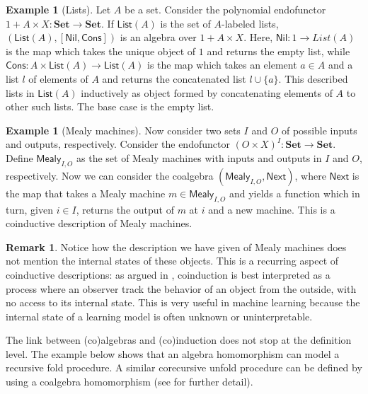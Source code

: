\documentclass[12pt,a4paper,openright,twoside]{report}
\theoremstyle{plain}
\theoremstyle{definition}
\newtheorem{remark}[proposition]{Remark}
\newtheorem{example}[proposition]{Example}
\begin{document}
\begin{example}[Lists]
  \label{ex: lists}
  Let $A$ be a set. Consider the polynomial endofunctor $1 + A \times X: \mathbf{Set} \to \mathbf{Set}$. If $\mathsf{List}(A)$ is the set of $A$-labeled lists, $(\mathsf{List}(A), [\mathsf{Nil}, \mathsf{Cons}])$ is an algebra over $1 + A \times X$. Here, $\mathsf{Nil}: 1 \to {List}(A)$ is the map which takes the unique object of $1$ and returns the empty list, while $\mathsf{Cons}: A \times \mathsf{List}(A) \to \mathsf{List}(A)$ is the map which takes an element $a \in A$ and a list $l$ of elements of $A$ and returns the concatenated list $l \cup \{a\}$. This described lists in $\mathsf{List}(A)$ inductively as object formed by concatenating elements of $A$ to other such lists. The base case is the empty list.
\end{example}

\begin{example}[Mealy machines]
  \label{ex: mealy}
  Now consider two sets $I$ and $O$ of possible inputs and outputs, respectively. Consider the endofunctor $(O \times X)^I: \mathbf{Set} \to \mathbf{Set}$.  Define $\mathsf{Mealy}_{I,O}$ as the set of Mealy machines with inputs and outputs in $I$ and $O$, respectively. Now we can consider the coalgebra $(\mathsf{Mealy}_{I,O}, \mathsf{Next})$, where $\mathsf{Next}$ is the map that takes a Mealy machine $m \in \mathsf{Mealy}_{I,O}$ and yields a function which in turn, given $i \in I$, returns the output of $m$ at $i$ and a new machine. This is a coinductive description of Mealy machines.
\end{example}

\begin{remark}
  Notice how the description we have given of Mealy machines does not mention the internal states of these objects. This is a recurring aspect of coinductive descriptions: as argued in \cite{jacobs1997tutorial}, coinduction is best interpreted as a process where an observer track the behavior of an object from the outside, with no access to its internal state. This is very useful in machine learning because the internal state of a learning model is often unknown or uninterpretable.
\end{remark}

The link between (co)algebras and (co)induction does not stop at the definition level. The example below shows that an algebra homomorphism can model a recursive fold procedure. A similar corecursive unfold procedure can be defined by using a coalgebra homomorphism (see \cite{gavranovicposition} for further detail).
\end{document}
